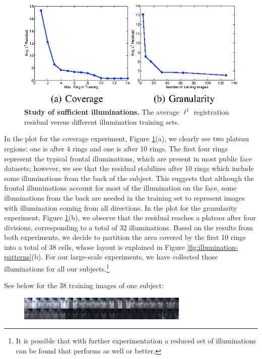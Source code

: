 \documentclass[10pt,journal,letterpaper,compsoc]{IEEEtran}
\begin{document}
\begin{figure}
\centering
\includegraphics{Figure_8}
\caption{{\bf Study of sufficient illuminations.} The average $\ell^1$ registration residual versus different illumination training sets. }
\label{fig:illumination-sufficiency}
\vspace{-3em}
\end{figure}

In the plot for the coverage experiment, Figure
\ref{fig:illumination-sufficiency}(a),
 we clearly see two plateau regions: one is after 4 rings
and one is after 10 rings. The first four rings represent the
typical frontal illuminations, which are present in most public
face datasets; however, we see that the residual stabilizes
after 10 rings which include some illuminations from the back
of the subject. This suggests that although the frontal
illuminations account for most of the illumination on the face,
some illuminations from the back are needed in the training set to
represent images with illumination coming from all directions.
In the plot for the granularity experiment, Figure
\ref{fig:illumination-sufficiency}(b), we observe that the
residual reaches a plateau after four divisions, corresponding
to a total of 32 illuminations. Based on the results from both
experiments, we decide to partition the area covered by the
first 10 rings into a total of 38 cells, whose layout is
explained in Figure \ref{fig:illumination-patterns}(b). For
our large-scale experiments, we have collected those
illuminations for all our subjects.\footnote{It is possible
that with further experimentation a reduced set of illuminations
can be found that performs as well or better.}

See below for the 38 training images of one subject:
\begin{figure}[h]
\centering
\includegraphics[width=3.2in]{Figure_8_5}
\vspace{-2em}
\end{figure}
\end{document}
